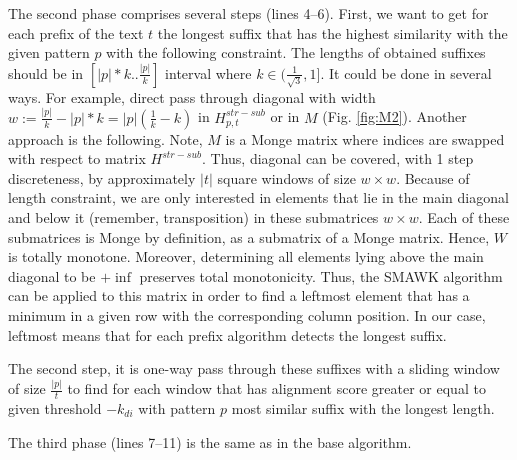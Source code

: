 The second phase comprises several steps (lines 4--6).
First, we want to get for each prefix of the text $t$ the longest suffix that has the highest similarity with the given pattern $p$ with the following constraint.
The lengths of obtained suffixes should be in $[|p|*k..\frac{|p|}{k}]$ interval where $k \in (\frac{1}{\sqrt{3}},1]$.
It could be done in several ways.
For example, direct pass through diagonal with width $w:= \frac{|p|}{k} - |p|*k = |p|(\frac{1}{k} - k)$ in $H^{str-sub}_{p,t}$ or in $M$ (Fig. \ref{fig:M2}).
Another approach is the following.
Note, $M$ is a Monge matrix where indices are swapped with respect to matrix $H^{str-sub}$.
Thus, diagonal can be covered, with 1 step discreteness, by approximately $ | t | $ square windows of size $ w \times w $.
Because of length constraint, we are only interested in elements that lie in the main diagonal and below it (remember, transposition) in these submatrices $w\times w$.
Each of these submatrices is Monge by definition, as a submatrix of a Monge matrix.
Hence, $W$ is totally monotone.
Moreover, determining all elements lying above the main diagonal to be $+\inf$ preserves total monotonicity.
Thus, the \textrm{SMAWK} algorithm\cite{.} can be applied to this matrix in order to find a leftmost element that has a minimum in a given row with the corresponding column position.
In our case, leftmost means that for each prefix algorithm detects the longest suffix.


The second step, it is one-way pass through these suffixes with a sliding window of size $\frac{|p|}{t}$ to find for each window that has alignment score greater or equal to given threshold $-k_{di}$ with pattern $p$ most similar suffix with the longest length. 

The third phase (lines 7--11) is the same as in the base algorithm.

